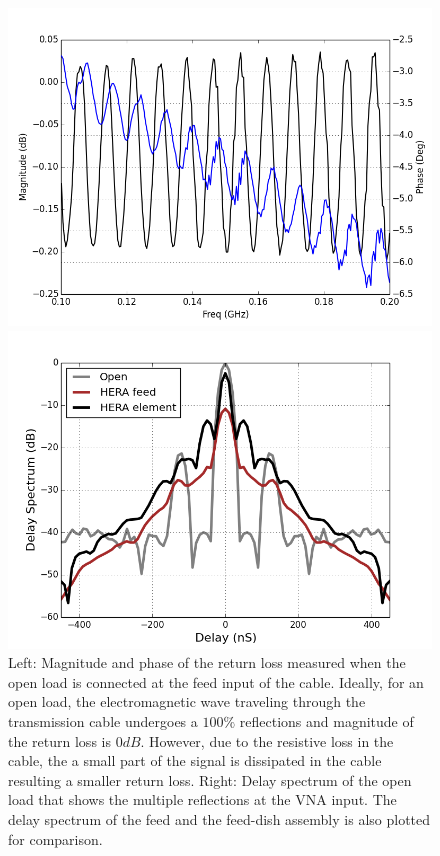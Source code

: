 \documentclass[twocolumn]{emulateapj}
\begin{document}
    \begin{figure}[ht]
    \begin{minipage}[b]{0.5\linewidth}
    \centering
    \includegraphics[angle=0, width=\linewidth]{plots/open_RL.png}
    \end{minipage}
    \hspace{0.1cm}
    \begin{minipage}[b]{0.5\linewidth}
    \centering
    \includegraphics[angle=0, width=\linewidth]{GB_reflectometry_part3/plot/open_delay.png}
    \end{minipage}
    \caption{Left: Magnitude and phase of the return loss measured when the open load is connected at the feed input of the cable. Ideally, for an open load, the electromagnetic wave traveling through the transmission cable undergoes a $100\%$ reflections and magnitude of the return loss is $0dB$. However, due to the resistive loss in the cable, the a small part of the signal is dissipated in the cable resulting a smaller return loss.  Right: Delay spectrum of the open load that shows the multiple reflections at the VNA input. The delay spectrum of the feed and the feed-dish assembly is also plotted for comparison.}
    \label{fig:open_RL}       
    \end{figure}
    
\end{document}
